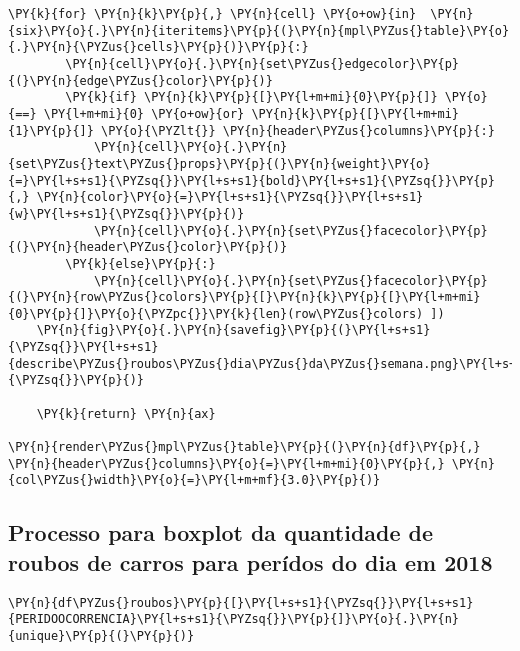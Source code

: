 \begin{tcolorbox}[breakable, size=fbox, boxrule=1pt, pad at break*=1mm,colback=cellbackground, colframe=cellborder]
\begin{Verbatim}[commandchars=\\\{\}]
    \PY{k}{for} \PY{n}{k}\PY{p}{,} \PY{n}{cell} \PY{o+ow}{in}  \PY{n}{six}\PY{o}{.}\PY{n}{iteritems}\PY{p}{(}\PY{n}{mpl\PYZus{}table}\PY{o}{.}\PY{n}{\PYZus{}cells}\PY{p}{)}\PY{p}{:}
        \PY{n}{cell}\PY{o}{.}\PY{n}{set\PYZus{}edgecolor}\PY{p}{(}\PY{n}{edge\PYZus{}color}\PY{p}{)}
        \PY{k}{if} \PY{n}{k}\PY{p}{[}\PY{l+m+mi}{0}\PY{p}{]} \PY{o}{==} \PY{l+m+mi}{0} \PY{o+ow}{or} \PY{n}{k}\PY{p}{[}\PY{l+m+mi}{1}\PY{p}{]} \PY{o}{\PYZlt{}} \PY{n}{header\PYZus{}columns}\PY{p}{:}
            \PY{n}{cell}\PY{o}{.}\PY{n}{set\PYZus{}text\PYZus{}props}\PY{p}{(}\PY{n}{weight}\PY{o}{=}\PY{l+s+s1}{\PYZsq{}}\PY{l+s+s1}{bold}\PY{l+s+s1}{\PYZsq{}}\PY{p}{,} \PY{n}{color}\PY{o}{=}\PY{l+s+s1}{\PYZsq{}}\PY{l+s+s1}{w}\PY{l+s+s1}{\PYZsq{}}\PY{p}{)}
            \PY{n}{cell}\PY{o}{.}\PY{n}{set\PYZus{}facecolor}\PY{p}{(}\PY{n}{header\PYZus{}color}\PY{p}{)}
        \PY{k}{else}\PY{p}{:}
            \PY{n}{cell}\PY{o}{.}\PY{n}{set\PYZus{}facecolor}\PY{p}{(}\PY{n}{row\PYZus{}colors}\PY{p}{[}\PY{n}{k}\PY{p}{[}\PY{l+m+mi}{0}\PY{p}{]}\PY{o}{\PYZpc{}}\PY{k}{len}(row\PYZus{}colors) ])
    \PY{n}{fig}\PY{o}{.}\PY{n}{savefig}\PY{p}{(}\PY{l+s+s1}{\PYZsq{}}\PY{l+s+s1}{describe\PYZus{}roubos\PYZus{}dia\PYZus{}da\PYZus{}semana.png}\PY{l+s+s1}{\PYZsq{}}\PY{p}{)}
    
    \PY{k}{return} \PY{n}{ax}

\PY{n}{render\PYZus{}mpl\PYZus{}table}\PY{p}{(}\PY{n}{df}\PY{p}{,} \PY{n}{header\PYZus{}columns}\PY{o}{=}\PY{l+m+mi}{0}\PY{p}{,} \PY{n}{col\PYZus{}width}\PY{o}{=}\PY{l+m+mf}{3.0}\PY{p}{)}
\end{Verbatim}
\end{tcolorbox}

    \hypertarget{processo-para-boxplot-da-quantidade-de-roubos-de-carros-para-peruxeddos-do-dia-em-2018}{%
\subsection*{Processo para boxplot da quantidade de roubos de carros para
perídos do dia em
2018}\label{processo-para-boxplot-da-quantidade-de-roubos-de-carros-para-peruxeddos-do-dia-em-2018}}

    \begin{tcolorbox}[breakable, size=fbox, boxrule=1pt, pad at break*=1mm,colback=cellbackground, colframe=cellborder]
\begin{Verbatim}[commandchars=\\\{\}]
\PY{n}{df\PYZus{}roubos}\PY{p}{[}\PY{l+s+s1}{\PYZsq{}}\PY{l+s+s1}{PERIDOOCORRENCIA}\PY{l+s+s1}{\PYZsq{}}\PY{p}{]}\PY{o}{.}\PY{n}{unique}\PY{p}{(}\PY{p}{)}
\end{Verbatim}
\end{tcolorbox}

